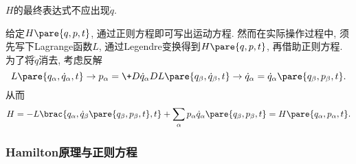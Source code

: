 \documentclass[../LectureNotes.tex]{subfiles}
\begin{document}
\begin{pitfall}
    $H$的最终表达式不应出现$\dot{q}$.
\end{pitfall}
给定$H\pare{q,p,t}$, 通过正则方程即可写出运动方程. 然而在实际操作过程中, 须先写下Lagrange函数$L$, 通过Legendre变换得到$H\pare{q,p,t}$, 再借助正则方程. 为了将$\dot{q}$消去, 考虑反解
\[ L\pare{q_\alpha,\dot{q}_\alpha,t} \rightarrow p_\alpha = \+D{\dot{q}_\alpha} DL\pare{q_\beta,\dot{q}_\beta, t} \rightarrow \dot{q}_\alpha = \dot{q}_\alpha \pare{q_\beta, p_\beta, t}. \]
从而
\[ H = -L\brac{q_\alpha, \dot{q}_\beta\pare{q_\beta,p_\beta,t},t} + \sum_\alpha p_\alpha\dot{q}_\alpha\pare{q_\beta,p_\beta,t} = H\pare{q_\alpha,p_\alpha,t}. \]



\subsubsection{Hamilton原理与正则方程} %
\label{ssub:hamilton原理与正则方程}
\end{document}
